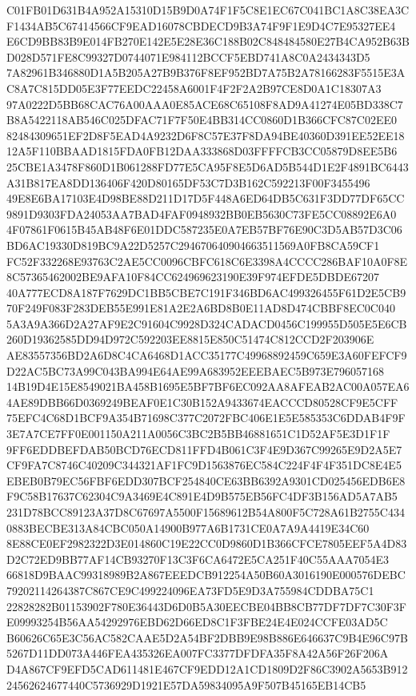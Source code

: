 \documentclass[UTF8,fontset=fandol,zihao=-4,a4paper]{ctexart}
\begin{document}
{{C01FB01D631B4A952A15310D15B9D0A74F1F5C8E1EC67C041BC1A8C38EA3CF1434AB5C67414566CF9EAD16078CBDECD9B3A74F9F1E9D4C7E95327EE4
E6CD9BB83B9E014FB270E142E5E28E36C188B02C848484580E27B4CA952B63BD028D571FE8C99327D0744071E984112BCCF5EBD741A8C0A2434343D5
7A82961B346880D1A5B205A27B9B376F8EF952BD7A75B2A78166283F5515E3AC8A7C815DD05E3F77EEDC22458A6001F4F2F2A2B97CE8D0A1C18307A3
97A0222D5BB68CAC76A00AAA0E85ACE68C65108F8AD9A41274E05BD338C7B8A5422118AB546C025DFAC71F7F50E4BB314CC0860D1B366CFC87C02EE0
82484309651EF2D8F5EAD4A9232D6F8C57E37F8DA94BE40360D391EE52EE1812A5F110BBAAD1815FDA0FB12DAA333868D03FFFFCB3CC05879D8EE5B6
25CBE1A3478F860D1B061288FD77E5CA95F8E5D6AD5B544D1E2F4891BC6443A31B817EA8DD136406F420D80165DF53C7D3B162C592213F00F3455496
49E8E6BA17103E4D98BE88D211D17D5F448A6ED64DB5C631F3DD77DF65CC9891D9303FDA24053AA7BAD4FAF0948932BB0EB5630C73FE5CC08892E6A0
4F07861F0615B45AB48F6E01DDC587235E0A7EB57BF76E90C3D5AB57D3C06BD6AC19330D819BC9A22D5257C294670640904663511569A0FB8CA59CF1
FC52F332268E93763C2AE5CC0096CBFC618C6E3398A4CCCC286BAF10A0F8E8C57365462002BE9AFA10F84CC624969623190E39F974EFDE5DBDE67207
40A777ECD8A187F7629DC1BB5CBE7C191F346BD6AC499326455F61D2E5CB970F249F083F283DEB55E991E81A2E2A6BD8B0E11AD8D474CBBF8EC0C040
5A3A9A366D2A27AF9E2C91604C9928D324CADACD0456C199955D505E5E6CB260D19362585DD94D972C592203EE8815E850C51474C812CCD2F203906E
AE83557356BD2A6D8C4CA6468D1ACC35177C49968892459C659E3A60FEFCF9D22AC5BC73A99C043BA994E64AE99A683952EEEBAEC5B973E796057168
14B19D4E15E8549021BA458B1695E5BF7BF6EC092AA8AFEAB2AC00A057EA64AE89DBB66D0369249BEAF0E1C30B152A9433674EACCCD80528CF9E5CFF
75EFC4C68D1BCF9A354B71698C377C2072FBC406E1E5E585353C6DDAB4F9F3E7A7CE7FF0E001150A211A0056C3BC2B5BB46881651C1D52AF5E3D1F1F
9FF6EDDBEFDAB50BCD76ECD811FFD4B061C3F4E9D367C99265E9D2A5E7CF9FA7C8746C40209C344321AF1FC9D1563876EC584C224F4F4F351DC8E4E5
EBEB0B79EC56FBF6EDD307BCF254840CE63BB6392A9301CD025456EDB6E8F9C58B17637C62304C9A3469E4C891E4D9B575EB56FC4DF3B156AD5A7AB5
231D78BCC89123A37D8C67697A5500F15689612B54A800F5C728A61B2755C4340883BECBE313A84CBC050A14900B977A6B1731CE0A7A9A4419E34C60
8E88CE0EF2982322D3E014860C19E22CC0D9860D1B366CFCE7805EEF5A4D83D2C72ED9BB77AF14CB93270F13C3F6CA6472E5CA251F40C55AAA7054E3
66818D9BAAC99318989B2A867EEEDCB912254A50B60A3016190E000576DEBC79202114264387C867CE9C499224096EA73FD5E9D3A755984CDDBA75C1
22828282B01153902F780E36443D6D0B5A30EECBE04BB8CB77DF7DF7C30F3FE09993254B56AA54292976EBD62D66ED8C1F3FBE24E4E024CCFE03AD5C
B60626C65E3C56AC582CAAE5D2A54BF2DBB9E98B886E646637C9B4E96C97B5267D11DD073A446FEA435326EA007FC3377DFDFA35F8A42A56F26F206A
D4A867CF9EFD5CAD611481E467CF9EDD12A1CD1809D2F86C3902A5653B91224562624677440C5736929D1921E57DA59834095A9F507B45165EB14CB5
}}
\end{document}
